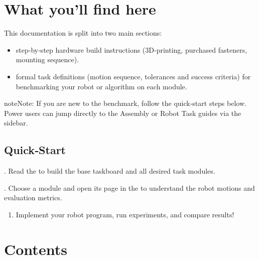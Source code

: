 \documentclass[letterpaper,10pt,english]{sphinxmanual}
\begin{document}
\chapter{What you’ll find here}
\label{\detokenize{index:what-youll-find-here}}
\sphinxAtStartPar
This documentation is split into two main sections:
\begin{itemize}
\item {} 
\sphinxAtStartPar
{} \textendash{} step‑by‑step hardware build instructions (3D‑printing,
purchased fasteners, mounting sequence).

\item {} 
\sphinxAtStartPar
{} \textendash{} formal task definitions (motion sequence, tolerances and
success criteria) for benchmarking your robot or algorithm on each module.

\end{itemize}

\begin{sphinxadmonition}{note}{Note:}
\sphinxAtStartPar
If you are new to the benchmark, follow the quick‑start steps below. Power
users can jump directly to the Assembly or Robot Task guides via the sidebar.
\end{sphinxadmonition}


\section{Quick‑Start}
\label{\detokenize{index:quickstart}}
. Read the {\hyperref[\detokenize{wbk_challenge_overview::doc}]{}} to build the base taskboard and all
desired task modules.

. Choose a module and open its page in the {\hyperref[\detokenize{wbk_challenge_robot_tasks_overview::doc}]{}}
to understand the robot motions and evaluation metrics.
\begin{enumerate}
%
\setcounter{enumi}{2}
\item {} 
\sphinxAtStartPar
Implement your robot program, run experiments, and compare results!

\end{enumerate}


\chapter{Contents}
\label{\detokenize{index:contents}}
\sphinxstepscope
\end{document}
